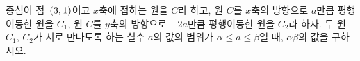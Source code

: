 중심이 점~$(3{,}\mkern3mu\mathopen{}1)$이고 $x$축에 접하는 원을 $C$라 하고, 원 $C$를 $x$축의 방향으로 $a$만큼 평행이동한 원을 $C_1$, 원 $C$를 $y$축의 방향으로 $-2a$만큼 평행이동한 원을 $C_2$라 하자. 두 원~$C_1$, $C_2$가 서로 만나도록 하는 실수 $a$의 값의 범위가 $\alpha\le a\le\beta$일 때, $\alpha\beta$의 값을 구하시오.
